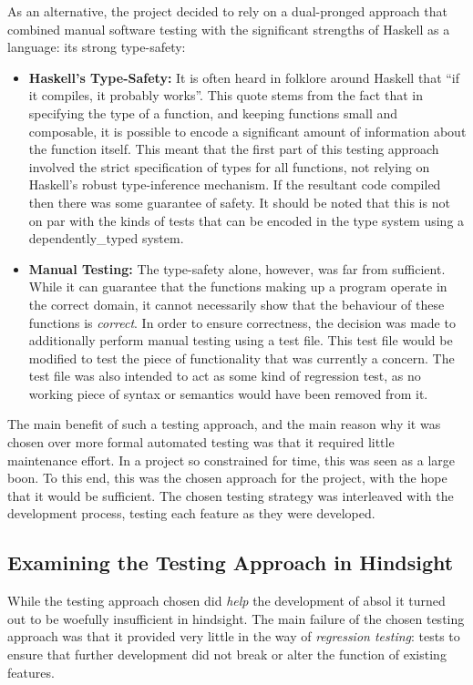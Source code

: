 As an alternative, the project decided to rely on a dual-pronged approach that combined manual software testing with the significant strengths of Haskell as a language: its strong type-safety:
\begin{itemize}
    \item \textbf{Haskell's Type-Safety:} It is often heard in folklore around Haskell that ``if it compiles, it probably works''. 
    This quote stems from the fact that in specifying the type of a function, and keeping functions small and composable, it is possible to encode a significant amount of information about the function itself.
    This meant that the first part of this testing approach involved the strict specification of types for all functions, not relying on Haskell's robust type-inference mechanism.
    If the resultant code compiled then there was some guarantee of safety.
    It should be noted that this is not on par with the kinds of tests that can be encoded in the type system using a \gls{dependently_typed} system.
    \item \textbf{Manual Testing:} The type-safety alone, however, was far from sufficient. 
    While it can guarantee that the functions making up a program operate in the correct domain, it cannot necessarily show that the behaviour of these functions is \textit{correct}.
    In order to ensure correctness, the decision was made to additionally perform manual testing using a test file.
    This test file would be modified to test the piece of functionality that was currently a concern.
    The test file was also intended to act as some kind of regression test, as no working piece of syntax or semantics would have been removed from it. 
\end{itemize}

The main benefit of such a testing approach, and the main reason why it was chosen over more formal automated testing was that it required little maintenance effort.
In a project so constrained for time, this was seen as a large boon. 
To this end, this was the chosen approach for the project, with the hope that it would be sufficient. 
The chosen testing strategy was interleaved with the development process, testing each feature as they were developed. 

\subsection{Examining the Testing Approach in Hindsight} %
\label{sub:examining_the_testing_approach_in_hindsight}
While the testing approach chosen did \textit{help} the development of \gls{absol} it turned out to be woefully insufficient in hindsight.
The main failure of the chosen testing approach was that it provided very little in the way of \textit{regression testing}: tests to ensure that further development did not break or alter the function of existing features. \\

